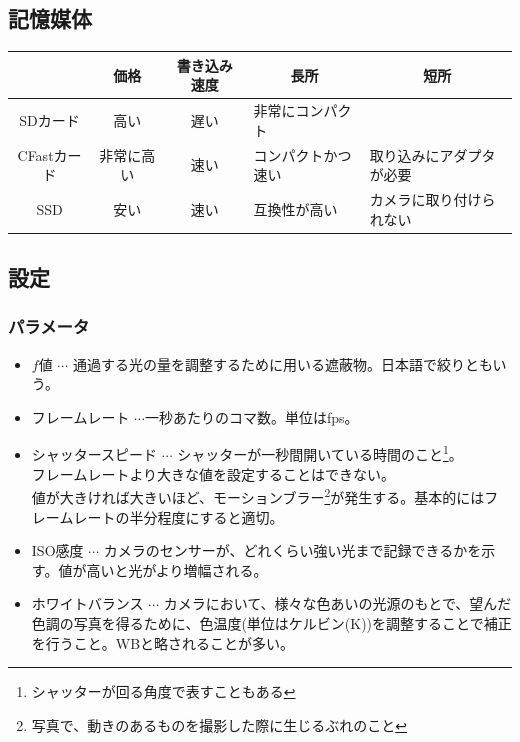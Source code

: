 \documentclass[dvipdfmx,jb5]{jreport}
\begin{document}
\subsection{記憶媒体}
\begin{table}[h]
      \begin{tabular}{|c||c|c|l|l|} \hline
                        & 価格       & 書き込み速度 & \multicolumn{1}{|c|}{長所} & \multicolumn{1}{|c|}{短所} \\ \hline\hline
            SDカード    & 高い       & 遅い         & 非常にコンパクト           &                            \\ \hline
            CFastカード & 非常に高い & 速い         & コンパクトかつ速い         & 取り込みにアダプタが必要   \\ \hline
            SSD         & 安い       & 速い         & 互換性が高い               & カメラに取り付けられない   \\ \hline
      \end{tabular}
\end{table}
\subsection{設定}
\subsubsection{パラメータ}
\begin{itemize}
      \item $f値$ $\cdots$ 通過する光の量を調整するために用いる遮蔽物。日本語で絞りともいう。
      \item フレームレート $\cdots$一秒あたりのコマ数。単位はfps。
      \item シャッタースピード $\cdots$ シャッターが一秒間開いている時間のこと\footnote{シャッターが回る角度で表すこともある}。\\フレームレートより大きな値を設定することはできない。 \\値が大きければ大きいほど、モーションブラー\footnote{写真で、動きのあるものを撮影した際に生じるぶれのこと}が発生する。基本的にはフレームレートの半分程度にすると適切。
      \item ISO感度 $\cdots$ カメラのセンサーが、どれくらい強い光まで記録できるかを示す。値が高いと光がより増幅される。
      \item ホワイトバランス $\cdots$ カメラにおいて、様々な色あいの光源のもとで、望んだ色調の写真を得るために、色温度(単位はケルビン(K))を調整することで補正を行うこと。WBと略されることが多い。
\end{itemize}
\end{document}
